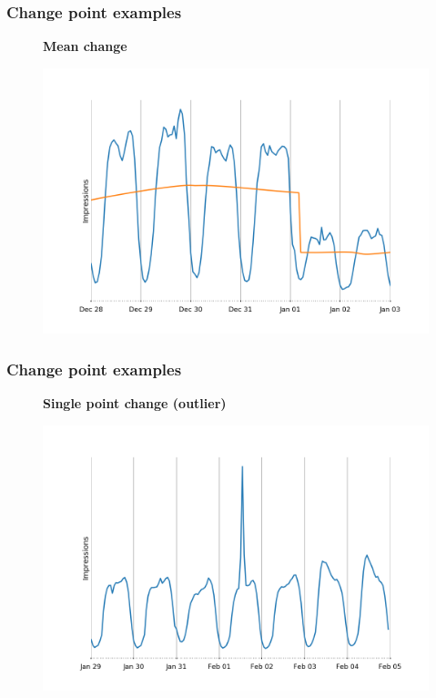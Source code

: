 \documentclass[intlimits, 9pt, unicode]{beamer}
\begin{document}
\begin{frame}
\frametitle{Change point examples}
\begin{figure}
\textbf{Mean change}\par\medskip
\includegraphics[scale=0.30]{images/1_examples_mean}
\end{figure}
\end{frame}


\begin{frame}
\frametitle{Change point examples}
\begin{figure}
\textbf{Single point change (outlier)}\par\medskip
\includegraphics[scale=0.30]{images/005_point}
\end{figure}
\end{frame}
\end{document}
